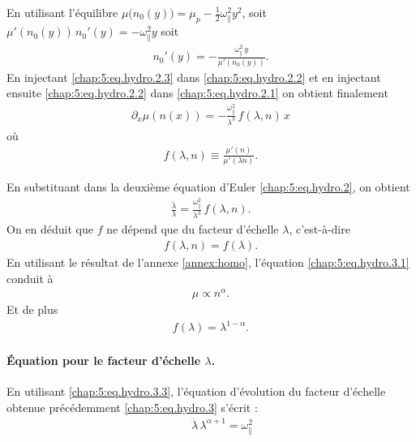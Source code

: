 En utilisant l'équilibre \(\mu\big(n_0(y)\big)=\mu_p-\tfrac12 \omega_\parallel^2 y^2\), soit \(\mu'(n_0(y))\,n_0'(y)=-\omega_\parallel^2 y\) soit 
\begin{eqnarray}\label{chap:5:eq.hydro.2.3}
	n_0'(y)=-\frac{\omega_\parallel^2\,y}{\mu'(n_0(y))}.	
\end{eqnarray}
En injectant \eqref{chap:5:eq.hydro.2.3} dans \eqref{chap:5:eq.hydro.2.2} et en injectant ensuite \eqref{chap:5:eq.hydro.2.2} dans \eqref{chap:5:eq.hydro.2.1} on obtient finalement
\begin{eqnarray}\label{chap:5:eq.hydro.2.4}
	\partial_x \mu ( n (x)) = -\frac{\omega_\parallel^2}{\lambda^3}\,f(\lambda,n)\,x 	
\end{eqnarray}
où
\begin{eqnarray}\label{chap:5:eq.hydro.2.4}
	f(\lambda,n)\equiv\frac{\mu'(n)}{\mu'(\lambda n)}.	
\end{eqnarray}

En substituant dans la deuxième équation d'Euler \eqref{chap:5:eq.hydro.2}, on obtient
\begin{eqnarray}\label{chap:5:eq.hydro.3}
	\frac{\ddot\lambda}{\lambda}  
	 =  \frac{\omega_\parallel^2}{\lambda^3} \, f(\lambda,n)  .
\end{eqnarray}
On en déduit que $f$ ne dépend que du facteur d'échelle $\lambda$, c’est-à-dire
\begin{eqnarray}\label{chap:5:eq.hydro.3.1}
	f(\lambda , n ) = f(\lambda).	
\end{eqnarray}
En utilisant le résultat de l'annexe \ref{annex:homo}, l’équation \eqref{chap:5:eq.hydro.3.1} conduit à
\begin{eqnarray}\label{chap:5:eq.hydro.3.2}
	\mu \propto n^\alpha.
\end{eqnarray}
Et de plus 
\begin{eqnarray}\label{chap:5:eq.hydro.3.3}
	f(\lambda) = \lambda^{1-\alpha}.
\end{eqnarray}


\medskip

\paragraph{Équation pour le facteur d'échelle $\lambda$.}

En utilisant \eqref{chap:5:eq.hydro.3.3}, l'équation d'évolution du facteur d'échelle obtenue précédemment \eqref{chap:5:eq.hydro.3} s'écrit :
\begin{eqnarray}\label{chap:5:eq.hydro.3.4}
	\qquad \ddot\lambda\,\lambda^{\alpha+1}=\omega_\parallel^2	
\end{eqnarray}


